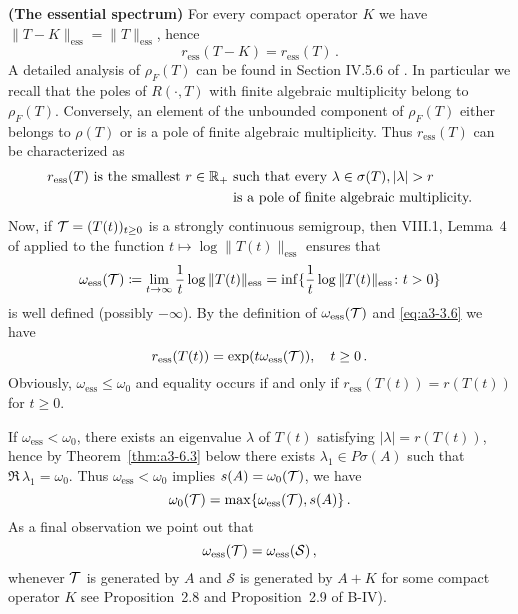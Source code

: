 \begin{example}{\textbf{(The essential spectrum)}}
For every compact operator $K$ we have $\|T - K\|_{\text{ess}} = \|T\|_{\text{ess}}$, hence
\begin{equation}\label{eq:a3-3.7}
r_{\text{ess}}(T - K) = r_{\text{ess}}(T)\,.
\end{equation}
A detailed analysis of $\rho_{F}(T)$ can be found in Section IV.5.6 of \citet{kato:1966}.
In particular we recall that the poles of $R(\cdot,T)$ with finite algebraic multiplicity belong to $\rho_{F}(T)$.
Conversely, an element of the unbounded component of $\rho_{F}(T)$ either belongs to $\rho(T)$ or is a pole of finite algebraic multiplicity.
Thus $r_{\text{ess}}(T)$ can be characterized as
\begin{equation}\label{eq:a3-3.8}
\begin{split}
r_{\text{ess}}(T) \text{ is the smallest } r \in \mathbb{R}_{+}
& \text{ such that every } \lambda \in \sigma(T), |\lambda| > r \\
& \text{ is a pole of finite algebraic multiplicity.}
\end{split}
\end{equation}
Now, if $\mathcal{T} = (T(t))_{t \geq 0}$ is a strongly continuous semigroup, then VIII.1, Lemma~4 of \citet{dunfordschwartz:1958} applied to the function $t \mapsto \log \|T(t)\|_{\text{ess}}$ ensures that
\begin{equation}\label{eq:a3-3.9}
\omega_{\text{ess}}(\mathcal{T}) \coloneqq \lim_{t \to \infty} \frac{1}{t} \log\|T(t)\|_{\text{ess}} = \inf \{\frac{1}{t} \log\|T(t)\|_{\text{ess}} \colon t > 0\}
\end{equation}
is well defined (possibly $-\infty$).
By the definition of $\omega_{\text{ess}}(\mathcal{T})$ and \eqref{eq:a3-3.6} we have
\begin{equation}\label{eq:a3-3.10}
r_{\text{ess}}(T(t)) = \exp(t\omega_{\text{ess}}(\mathcal{T})), \quad t \geq 0\,.
\end{equation}
Obviously, $\omega_{\text{ess}} \leq \omega_{0}$ and equality occurs if and only if $r_{\text{ess}}(T(t)) = r(T(t))$ for $t \geq 0$.

If $\omega_{\text{ess}} < \omega_{0}$, there exists an eigenvalue $\lambda$ of $T(t)$ satisfying $|\lambda| = r(T(t))$, hence by Theorem~\ref{thm:a3-6.3} below there exists $\lambda_{1} \in P\sigma(A)$ such that $\Re\,\lambda_{1} = \omega_{0}$.
Thus $\omega_{\text{ess}} < \omega_{0}$ implies $s(A) = \omega_{0}(\mathcal{T})$, \ie we have
\begin{equation}\label{eq:a3-3.11}
\omega_{0}(\mathcal{T}) = \max\{\omega_{\text{ess}}(\mathcal{T}),s(A)\}\,.
\end{equation}
As a final observation we point out that
\begin{equation}\label{eq:a3-3.12}
\omega_{\text{ess}}(\mathcal{T}) = \omega_{\text{ess}}({\mathcal{S}})\,,
\end{equation}
whenever $\mathcal{T}$ is generated by $A$ and $\mathcal{S}$ is generated by $A + K$ for some compact operator $K$ 
see Proposition~2.8  and Proposition~2.9 of B-IV).
\end{example}

